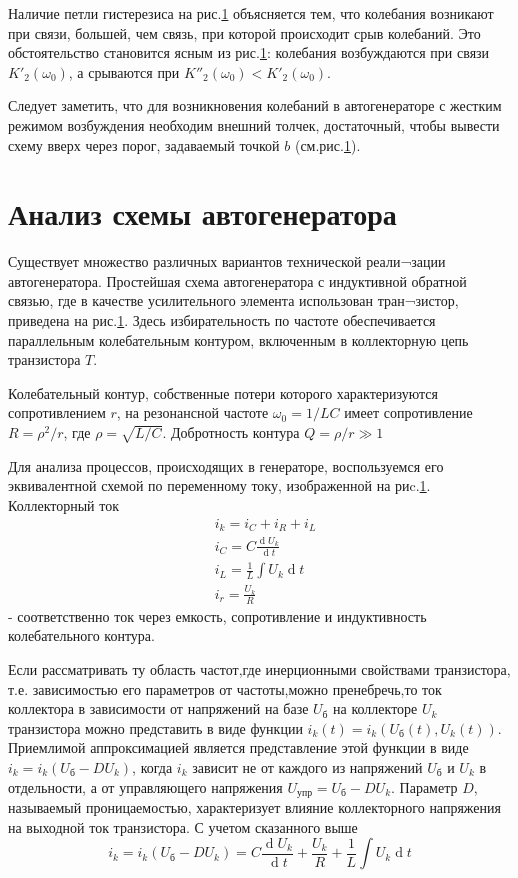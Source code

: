 Наличие петли гистерезиса на рис.\ref{} объясняется тем, что колебания возникают при связи, большей, чем связь, при которой происходит срыв колебаний. Это обстоятельство становится ясным из рис.\ref{}: колебания возбуждаются при связи $K'_2(\omega_0) $, а срываются при $K''_2(\omega_0)<K'_2(\omega_0)$.

Следует заметить, что для возникновения колебаний в автогенераторе с жестким режимом возбуждения необходим внешний толчек, достаточный, чтобы вывести схему вверх через порог, задаваемый точкой $b$ (см.рис.\ref{}).

\section{Анализ схемы автогенератора}
Существует множество различных вариантов технической реали¬зации автогенератора.
Простейшая схема автогенератора с индуктивной обратной связью, где в качестве усилительного элемента использован тран¬зистор, приведена на рис.\ref{}. Здесь избирательность по частоте обеспечивается параллельным колебательным контуром, включенным в коллекторную цепь транзистора $T$.

Колебательный контур, собственные потери которого характеризуются сопротивлением $r$, на резонансной частоте $\omega_0=1/{LC}$ имеет сопротивление $R=\rho^2/r$, где $\rho=\sqrt{L/C}$. Добротность контура $Q=\rho/r\gg1$

Для анализа процессов, происходящих в генераторе, воспользуемся его эквивалентной схемой по переменному току, изображенной на риc.\ref{}. Коллекторный ток
\begin{equation*}
\begin{aligned}
&i_k=i_C+i_R+i_L \\
&i_C=C\frac{\operatorname dU_k}{\operatorname dt} \\
&i_L=\frac{1}{L}\int U_k \operatorname dt \\
&i_r=\frac{U_k}{R}
\end{aligned}
\end{equation*}
- соответственно ток через емкость, сопротивление и индуктивность колебательного контура.

Если рассматривать ту область частот,где инерционными свойствами транзистора, т.е. зависимостью его параметров от частоты,можно пренебречь,то ток коллектора в зависимости от напряжений на базе $U_\text{б}$ на коллекторе $U_k$ транзистора можно представить в виде функции $i_k(t)=i_k(U_\text{б}(t),U_k(t))$. Приемлимой аппроксимацией является представление этой функции в виде $i_k=i_k(U_\text{б}-DU_k)$, когда $i_k$ зависит не от каждого из напряжений $U_\text{б}$ и $U_k$ в отдельности, а от управляющего напряжения $U_\text{упр}=U_\text{б}-DU_k$. Параметр $D$, называемый проницаемостью, характеризует влияние коллекторного напряжения на выходной ток транзистора. С учетом сказанного выше
\begin{equation}
i_k=i_k(U_\text{б}-DU_k)=C\frac{\operatorname dU_k}{\operatorname dt}+\frac{U_k}{R}+\frac{1}{L}\int U_k \operatorname dt
\label{eq:8}
\end{equation}{}


